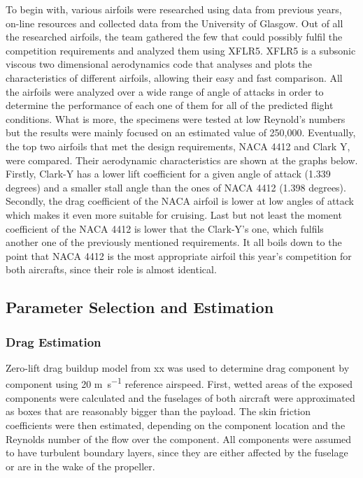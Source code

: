 To begin with, various airfoils were researched using data from previous years, on-line resources and collected data from the University of Glasgow. Out of all the researched airfoils, the team gathered the few that could possibly fulfil the competition requirements and analyzed them using XFLR5.
 XFLR5 is a subsonic viscous two dimensional aerodynamics code that analyses and plots the characteristics of different airfoils, allowing their easy and fast comparison. All the airfoils were analyzed over a wide range of angle of attacks in order to determine the performance of each one of them for all of the predicted flight conditions. What is more, the specimens were tested at low Reynold’s numbers but the results were mainly focused on an estimated value of 250,000.
Eventually, the top two airfoils that met the design requirements, NACA 4412 and Clark Y, were compared. Their aerodynamic characteristics are shown at the graphs below. 
Firstly, Clark-Y has a lower lift coefficient for a given angle of attack (1.339 degrees) and a smaller stall angle than the ones of NACA 4412 (1.398 degrees). Secondly, the drag coefficient of the NACA airfoil is lower at low angles of attack which makes it even more suitable for cruising. Last but not least the moment coefficient of the NACA 4412 is lower that the  Clark-Y’s one, which fulfils another one of the previously mentioned requirements. 
It all boils down to the point that NACA 4412 is the most appropriate airfoil this year’s competition for both aircrafts, since their role is almost identical.


\subsection{Parameter Selection and Estimation}

\subsubsection{Drag Estimation}
Zero-lift drag buildup model from xx was used to determine drag component by component using 20 \si{\meter\per\second} reference airspeed. First, wetted areas of the exposed components were calculated and the fuselages of both aircraft were approximated as boxes that are reasonably bigger than the payload. The skin friction coefficients were then estimated, depending on the component location and the Reynolds number of the flow over the component. All components were assumed to have turbulent boundary layers, since they are either affected by the fuselage or are in the wake of the propeller.

